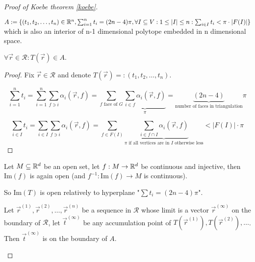 \begin{proof}[Proof of Koebe theorem \ref{koebe}]
	\begin{defn}
		$A := \{(t_1, t_2, \dots, t_n) \in \mathbb{R}^n, \sum_{i = 1}^n t_i = (2n-4)\pi, \forall I \subseteq V : 1 \leq |I| \leq n: \sum_{i \in I} t_i < \pi \cdot |F(I)|\}$ which is also an interior of n-1 dimensional polytope embedded in n dimensional space.
	\end{defn}

	\begin{lemma}[\ref{koebe-first-b}]
		$\forall \overrightarrow{r} \in \mathcal{R} : T(\overrightarrow{r}) \in A$.
	\end{lemma}

	\begin{proof}
		Fix $\overrightarrow{r} \in \mathcal{R}$ and denote $T(\overrightarrow{r}) =: (t_1, t_2, \dots, t_n)$.
		
		$$
		\sum_{i = 1}^{n} t_i = \sum_{i = 1}^n \sum_{f \ni i} \alpha_i (\overrightarrow{r}, f) = \sum_{f \text{ face of } G} \underbrace{\sum_{i \in f} \alpha_i (\overrightarrow{r}, f)}_{\pi} = \underbrace{(2n-4)}_{\text{number of faces in triangulation}} \pi
		$$
		
		$$
		\sum_{i \in I} t_i = \sum_{i \in I} \sum_{f \ni i} \alpha_i (\overrightarrow{r}, f) = \sum_{f \in F(I)} \underbrace{\sum_{i \in f \cap I} \alpha_i (\overrightarrow{r}, f)}_{\pi \text{ if all vertices are in } I \text{ otherwise less}} < |F(I)| \cdot \pi
		$$
	\end{proof}

	\begin{fact}
		Let $M \subseteq \mathbb{R}^d$ be an open set, let $f : M \to \mathbb{R}^d$ be continuous and injective, then $\text{Im}(f)$ is again open (and $f^{-1} : \text{Im}(f) \to M$ is continuous).
	\end{fact}

	\noindent So $\text{Im}(T)$ is open relatively to hyperplane "$\sum t_i = (2n-4)\pi$".
	
	\newcommand{\rr}[1]{\overrightarrow{r}^{(#1)}}
	
	\begin{lemma}
		Let $\rr{1}, \rr{2}, \dots, \rr{n}$ be a sequence in $\mathcal{R}$ whose limit is a vector $\rr{\infty}$ on the boundary of $\mathcal{R}$, let $\overrightarrow{t}^{(\infty)}$ be any accumulation point of $T(\rr{1}), T(\rr{2}), \dots$. Then $\overrightarrow{t}^{(\infty)}$ is on the boundary of $A$.
	\end{lemma}


\end{proof}
